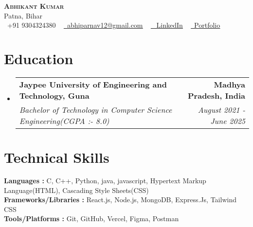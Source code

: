 \documentclass[letterpaper,11pt]{article}
\makeatletter
\newcommand{\resumeSubheading}[4]{
  \vspace{-2pt}\item
	\begin{tabular*}{1.0\textwidth}[t]{l@{\extracolsep{\fill}}r}
  	\textbf{#1} & \textbf{\small #2} \\
  	\textit{\small#3} & \textit{\small #4} \\
	\end{tabular*}\vspace{-7pt}
}
\newcommand{\resumeSubHeadingListStart}{\begin{itemize}[leftmargin=0.0in, label={}]}
\newcommand{\resumeSubHeadingListEnd}{\end{itemize}}
\makeatother
\begin{document}
 

\begin{center}
	{\Huge  {\scshape \textbf{Abhikant Kumar}}} \\ \vspace{3pt}
	Patna, Bihar  \\ \vspace{2pt}
	\small \raisebox{-0.1\height}\faPhone\ +91 9304324380 ~ \href{mailto:x@gmail.com}{\raisebox{-0.2\height}\faEnvelope\  \underline{abhiparnav12@gmail.com}} ~
	\href{https://linkedin.com/in//}{\raisebox{-0.2\height}\faLinkedin\ \underline{ LinkedIn}} ~
   \href{https://abhikant-portfolio.netlify.app/}{\raisebox{-0.2\height}\faGlobe\ \underline{Portfolio}}
\end{center}


\section{Education}
  \resumeSubHeadingListStart
	\resumeSubheading
  	{Jaypee University of Engineering and Technology, Guna}{Madhya Pradesh, India}
  	{Bachelor of Technology in Computer Science Engineering(CGPA  :-  8.0)}{August 2021 - June 2025}
   \vspace{1pt}
  \resumeSubHeadingListEnd

  
 
\section{Technical Skills }
 \begin{itemize}[leftmargin=0.15in, label={}]
	\small{\item{
 	\textbf{Languages : }{ C, C++, Python, java, javascript, Hypertext Markup Language(HTML), Cascading Style Sheets(CSS) } \\  \vspace{4pt}
        \textbf{Frameworks/Libraries :}  {React.js, Node.js, MongoDB, Express.Js, Tailwind CSS } \\  \vspace{4pt}
        \textbf{Tools/Platforms :}  {Git, GitHub, Vercel, Figma, Postman} \\
	}}
 \end{itemize}
 \vspace{-11pt}



\end{document}
